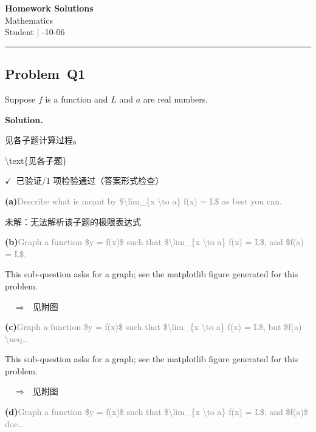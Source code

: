 \documentclass[12pt, a4paper]{article}
\newcommand{\problem}[1]{\subsection*{Problem~#1}}
\newcommand{\solution}{%
  \par\noindent
  {\color{solutiongreen}\bfseries Solution.}\par
}
\newcommand{\verifyok}{\textcolor{solutiongreen}{\ensuremath{\checkmark}\ 已验证}}
\begin{document}
\begin{center}
  {\LARGE\bfseries Homework Solutions} \\[0.6em]
  {\large\color{solutionblue} Mathematics} \\[0.4em]
  Student \quad | -10-06
\end{center}
\vspace{0.5em}\hrule\vspace{1.2em}
\problem{Q1}

\begin{stepbox}
Suppose $f$ is a function and $L$ and $a$ are real numbers.
\end{stepbox}

\solution

\begin{stepbox}
见各子题计算过程。
\end{stepbox}

\begin{center}
\textbackslash{}text\{见各子题\}
\end{center}

\begin{verifybox}\small \verifyok{}/1 项检验通过（答案形式检查） \end{verifybox}

\vspace{0.3em}
\textbf{(a)}\quad \textcolor{gray}{\small Describe what is meant by \$\textbackslash{}lim\_\{x \textbackslash{}to a\} f(x) = L\$ as best you can.}

\textcolor{warnamber}{未解：无法解析该子题的极限表达式}

\textbf{(b)}\quad \textcolor{gray}{\small Graph a function \$y = f(x)\$ such that \$\textbackslash{}lim\_\{x \textbackslash{}to a\} f(x) = L\$, and \$f(a) = L\$.}

This sub-question asks for a graph; see the matplotlib figure generated for this problem.

$\quad\Rightarrow\quad \text{见附图}$

\textbf{(c)}\quad \textcolor{gray}{\small Graph a function \$y = f(x)\$ such that \$\textbackslash{}lim\_\{x \textbackslash{}to a\} f(x) = L\$, but \$f(a) \textbackslash{}neq…}

This sub-question asks for a graph; see the matplotlib figure generated for this problem.

$\quad\Rightarrow\quad \text{见附图}$

\textbf{(d)}\quad \textcolor{gray}{\small Graph a function \$y = f(x)\$ such that \$\textbackslash{}lim\_\{x \textbackslash{}to a\} f(x) = L\$, and \$f(a)\$ doe…}
\end{document}
